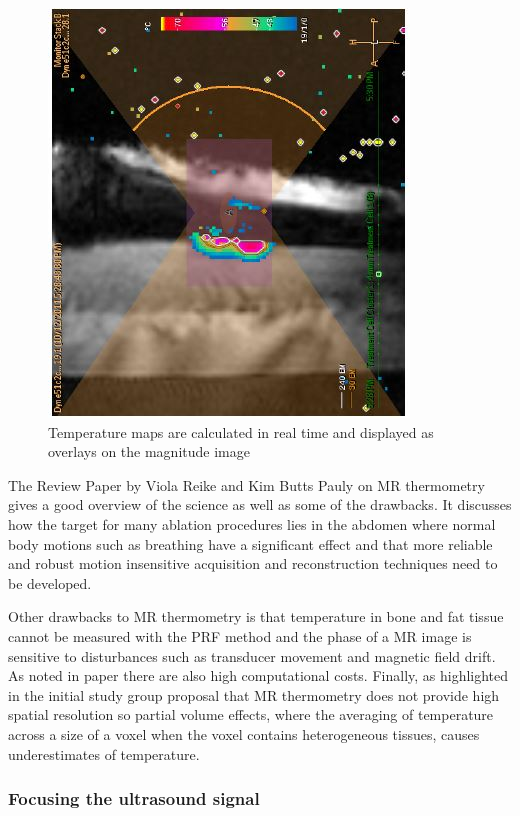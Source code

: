 \documentclass[11pt]{article} %
\begin{document}
	\begin{figure}
		\centering
		\includegraphics[width=0.7\linewidth]{Report_images/MRIimage}
		\caption{Temperature maps are calculated in real time and displayed as overlays on the magnitude image}
		\label{fig:mriimage}
	\end{figure}
	
	The Review Paper by Viola Reike and Kim Butts Pauly on MR thermometry \cite{Rieke2008} gives a good overview of the science as well as some of the drawbacks.  	It discusses how the target for many ablation procedures lies in the abdomen where normal body motions such as breathing have a significant effect and that more reliable and robust motion insensitive acquisition and reconstruction techniques need to be developed.
	 
	Other drawbacks to MR thermometry is that temperature in bone and fat tissue cannot be measured with the PRF method and the phase of a MR image is sensitive to disturbances such as transducer movement and magnetic field drift. As noted in paper \cite{Hosseini2018} there are also high computational costs. Finally, as highlighted in the initial study group proposal that MR thermometry does not provide high spatial resolution so partial volume effects, where the averaging of temperature across a size of a voxel when the voxel contains heterogeneous tissues, causes underestimates of temperature. 
	
	
	

	
	\subsubsection{Focusing the ultrasound signal}
	
\end{document}
